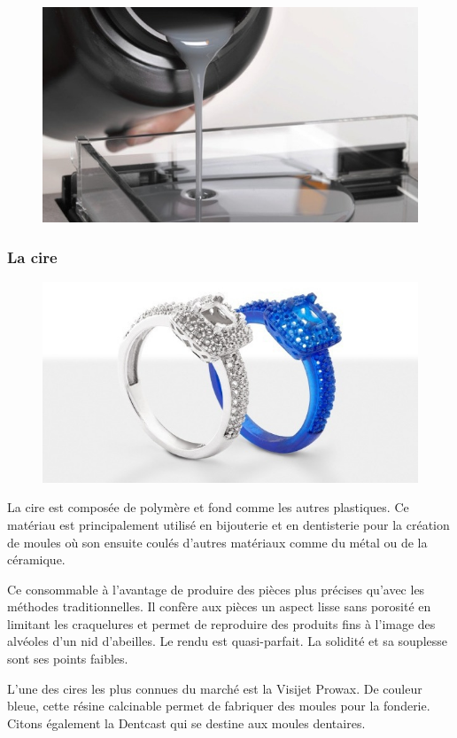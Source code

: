 \documentclass{article}
\begin{document}
\begin{figure}[h!]
\centering
\includegraphics[scale=0.4]{./images/resine.png}
\end{figure}\hfill
\newpage

\subsubsection{La cire}
\begin{figure}[h!]
\centering
\includegraphics[scale=0.4]{./images/cire.png}
\end{figure}\hfill
 \par\leavevmode\par
La cire est composée de polymère et fond comme les autres plastiques. Ce matériau est principalement utilisé en bijouterie et en dentisterie pour la création de moules où son ensuite coulés d'autres matériaux comme du métal ou de la céramique.\hfill
 \par\leavevmode\par
Ce consommable à l'avantage de produire des pièces plus précises qu'avec les méthodes traditionnelles. Il confère aux pièces un aspect lisse sans porosité en limitant les craquelures et permet de reproduire des produits fins à l'image des alvéoles d'un nid d'abeilles. Le rendu est quasi-parfait. La solidité et sa souplesse sont ses points faibles.\hfill
 \par\leavevmode\par
L'une des cires les plus connues du marché est la Visijet Prowax. De couleur bleue, cette résine calcinable permet de fabriquer des moules pour la fonderie. Citons également la Dentcast qui se destine aux moules dentaires.
\newpage
\end{document}
